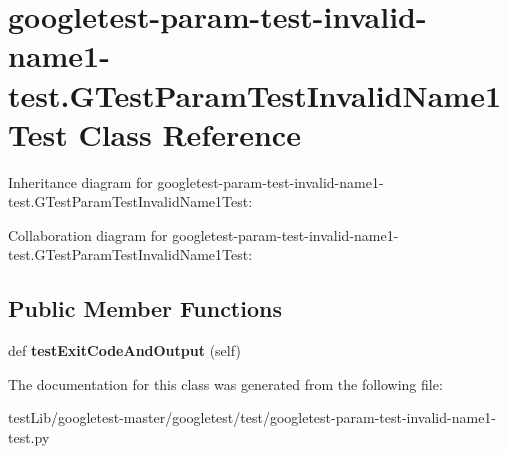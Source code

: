 \hypertarget{classgoogletest-param-test-invalid-name1-test_1_1GTestParamTestInvalidName1Test}{}\section{googletest-\/param-\/test-\/invalid-\/name1-\/test.G\+Test\+Param\+Test\+Invalid\+Name1\+Test Class Reference}
\label{classgoogletest-param-test-invalid-name1-test_1_1GTestParamTestInvalidName1Test}


Inheritance diagram for googletest-\/param-\/test-\/invalid-\/name1-\/test.G\+Test\+Param\+Test\+Invalid\+Name1\+Test\+:


Collaboration diagram for googletest-\/param-\/test-\/invalid-\/name1-\/test.G\+Test\+Param\+Test\+Invalid\+Name1\+Test\+:
\subsection*{Public Member Functions}
\begin{DoxyCompactItemize}
\item 
\mbox{\label{classgoogletest-param-test-invalid-name1-test_1_1GTestParamTestInvalidName1Test_a2b7024a50e0b3b0fe9b0c6d28e470681}} 
def {\bfseries test\+Exit\+Code\+And\+Output} (self)
\end{DoxyCompactItemize}


The documentation for this class was generated from the following file\+:\begin{DoxyCompactItemize}
\item 
test\+Lib/googletest-\/master/googletest/test/googletest-\/param-\/test-\/invalid-\/name1-\/test.\+py\end{DoxyCompactItemize}
